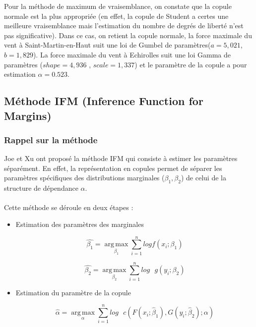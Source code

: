 Pour la méthode de maximum de vraisemblance, on constate que la copule normale est la plus appropriée (en effet, la copule de Student a certes une meilleure vraisemblance mais l'estimation du nombre de degrés de liberté n'est pas significative). Dans ce cas, on retient la copule normale, la force maximale du vent à Saint-Martin-en-Haut suit une loi de Gumbel de paramètres($a = 5,021$, $b=1,829 $). La force maximale du vent à Echirolles suit une loi Gamma de paramètres ($shape = 4,936$ , $scale=1,337$) et le paramètre de la copule a pour estimation $\alpha=0.523$.

\subsection{Méthode IFM (Inference Function for Margins)}

\subsubsection{Rappel sur la méthode}

Joe et Xu ont proposé la méthode IFM qui consiste à estimer les paramètres séparément. En effet, la représentation en copules permet de séparer les paramètres spécifiques des distributions marginales ($\beta_1,\beta_2$) de celui de la structure de dépendance $\alpha$.
\\ \\
Cette méthode se déroule en deux étapes :
~\\
\begin{itemize}

\item Estimation des paramètres des marginales
 
\begin{equation*}
\hat{\beta_1} = \underset{\beta_1}{\operatorname{arg\,max}} \sum_{i=1}^n log f(x_i;\beta_1)
\end{equation*}

\begin{equation*}
\hat{\beta_2} = \underset{\beta_2}{\operatorname{arg\,max}} \sum_{i=1}^n log \text{ }g(y_i;\beta_2)
\end{equation*}

\item Estimation du paramètre de la copule

\begin{equation*}
\hat{\alpha} = \underset{\alpha}{\operatorname{arg\,max}} \sum_{i=1}^n log \text{ }c\left(F(x_i;\hat{\beta}_1),G(y_i;\hat{\beta}_2);\alpha\right)
\end{equation*}

\end{itemize}


